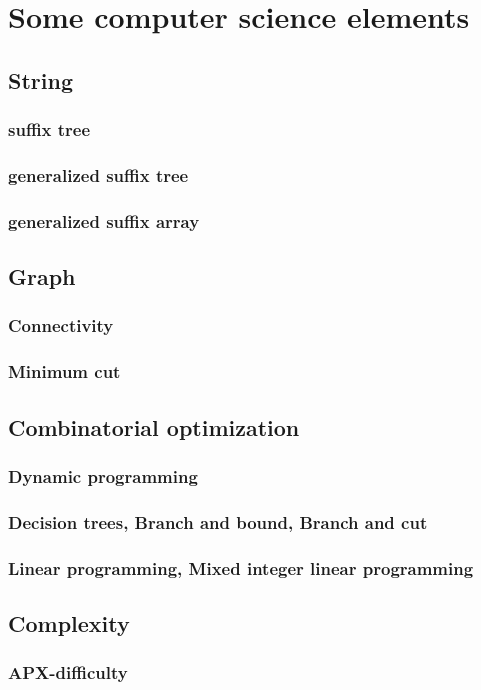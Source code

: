 \documentclass[draft]{memoir}
\begin{document}
 \section{Some computer science elements}
  \subsection{String}
   \subsubsection{suffix tree}
   \subsubsection{generalized suffix tree}
   \subsubsection{generalized suffix array}
  \subsection{Graph}
   \subsubsection{Connectivity}
   \subsubsection{Minimum cut}
  \subsection{Combinatorial optimization}
   \subsubsection{Dynamic programming}
   \subsubsection{Decision trees, Branch and bound, Branch and cut}
   \subsubsection{Linear programming, Mixed integer linear programming}
  \subsection{Complexity}
   \subsubsection{APX-difficulty}
\end{document}
